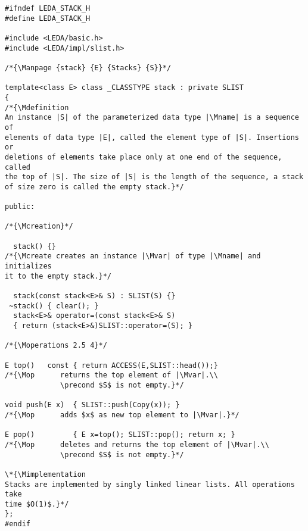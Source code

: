 {\footnotesize
\begin{verbatim}
#ifndef LEDA_STACK_H
#define LEDA_STACK_H

#include <LEDA/basic.h>
#include <LEDA/impl/slist.h>

/*{\Manpage {stack} {E} {Stacks} {S}}*/

template<class E> class _CLASSTYPE stack : private SLIST
{
/*{\Mdefinition
An instance |S| of the parameterized data type |\Mname| is a sequence of 
elements of data type |E|, called the element type of |S|. Insertions or
deletions of elements take place only at one end of the sequence, called 
the top of |S|. The size of |S| is the length of the sequence, a stack
of size zero is called the empty stack.}*/

public:

/*{\Mcreation}*/

  stack() {}
/*{\Mcreate creates an instance |\Mvar| of type |\Mname| and initializes 
it to the empty stack.}*/

  stack(const stack<E>& S) : SLIST(S) {}
 ~stack() { clear(); }
  stack<E>& operator=(const stack<E>& S) 
  { return (stack<E>&)SLIST::operator=(S); }

/*{\Moperations 2.5 4}*/

E top()   const { return ACCESS(E,SLIST::head());}
/*{\Mop      returns the top element of |\Mvar|.\\ 
             \precond $S$ is not empty.}*/

void push(E x)  { SLIST::push(Copy(x)); }
/*{\Mop      adds $x$ as new top element to |\Mvar|.}*/

E pop()         { E x=top(); SLIST::pop(); return x; }
/*{\Mop      deletes and returns the top element of |\Mvar|.\\ 
             \precond $S$ is not empty.}*/

\*{\Mimplementation
Stacks are implemented by singly linked linear lists. All operations take 
time $O(1)$.}*/ 
};
#endif
\end{verbatim}
}%


